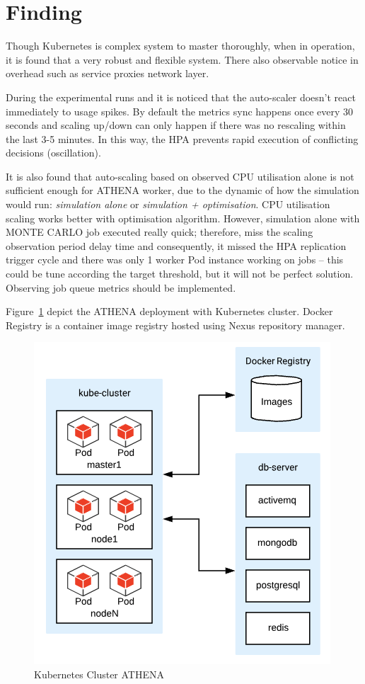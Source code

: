 \newpage

\section{Finding}

Though Kubernetes is complex system to master thoroughly, when in operation, it is found that a very robust and flexible system. There also observable notice in overhead such as service proxies network layer. 

During the experimental runs and it is noticed that the auto-scaler doesn't react immediately to usage spikes. By default the metrics sync happens once every 30 seconds and scaling up/down can only happen if there was no rescaling within the last 3-5 minutes. In this way, the HPA prevents rapid execution of conflicting decisions (oscillation). 

It is also found that auto-scaling based on observed CPU utilisation alone is not sufficient enough for ATHENA worker, due to the dynamic of how the simulation would run: \emph{simulation alone} or \emph{simulation + optimisation}. CPU utilisation scaling works better with optimisation algorithm. However, simulation alone with MONTE CARLO job executed really quick; therefore, miss the scaling observation period delay time and consequently, it missed the HPA replication trigger cycle and there was only 1 worker Pod instance working on jobs -- this could be tune according the target threshold, but it will not be perfect solution. Observing job queue metrics should be implemented.

Figure~\ref{fig:kubeAthena} depict the ATHENA deployment with Kubernetes cluster. Docker Registry is a container image registry hosted using Nexus repository manager.

\begin{figure}[H]
\centering
\includegraphics[width=0.5\paperwidth]{Figures/ATHENA_Kube_cluster}
\decoRule
\caption[Kubernetes Cluster ATHENA]{Kubernetes Cluster ATHENA}
\label{fig:kubeAthena}
\end{figure}








